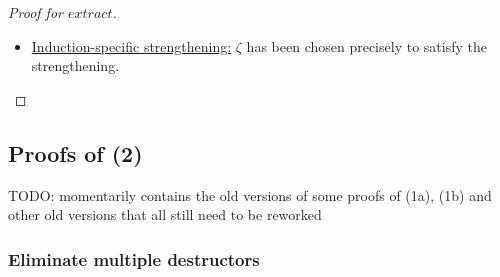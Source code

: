 \documentclass[11pt]{article} %
\begin{document}
\begin{proof}[Proof for $extract$]
\begin{itemize}
\begin{itemize}
\begin{enumerate}
\item Since $q_{\epsilon_i} = q_{\epsilon'_i}$, for $i \in \{2, ..., n-1\}$, these are hole patterns by the induction hypothesis. The same goes for $q_{\epsilon_n} = q_\zeta'$. Finally, $\zeta$ has been chosen such that its left-hand side is a hole pattern.
\end{enumerate}

\item \underline{Induction-specific strengthening:} $\zeta$ has been chosen precisely to satisfy the strengthening.
\end{itemize}

\end{itemize}

\end{proof}

\subsection{Proofs of (2)}

TODO: momentarily contains the old versions of some proofs of (1a), (1b) and other old versions that all still need to be reworked

\subsubsection{Eliminate multiple destructors}
\end{document}
